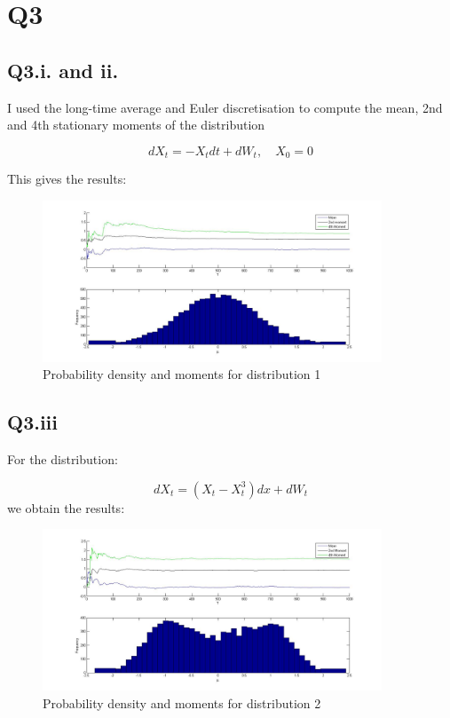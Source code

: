 \documentclass[11pt]{article} %
\begin{document}
\section{Q3}
\subsection{Q3.i. and ii.}
I used the long-time average and Euler discretisation to compute the mean, 2nd and 4th stationary moments of the distribution

\begin{equation}
	dX_{t} = -X_{t}dt+dW_{t},\quad X_{0} = 0
\end{equation}

This gives the results:
\begin{figure}[h!]
\centering
\includegraphics[width=0.9\textwidth]{q3i.jpg}
\caption{Probability density and moments for distribution 1}
\end{figure}

\subsection{Q3.iii}
For the distribution:

\begin{equation}
	dX_{t} = (X_{t} - X_{t}^{3})dx + dW_{t}
\end{equation}
we obtain the results:
\begin{figure}[h!]
\centering
\includegraphics[width=0.9\textwidth]{q3iii.jpg}
\caption{Probability density and moments for distribution 2}
\end{figure}
\end{document}
